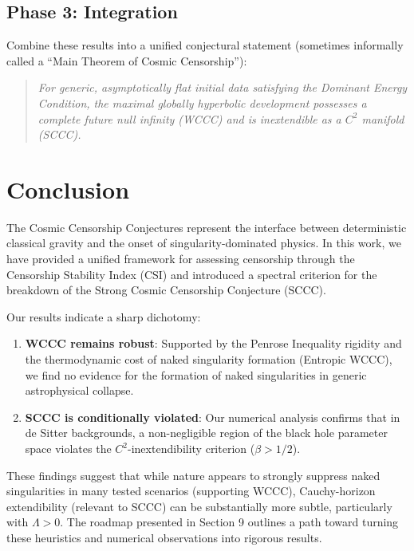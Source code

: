 \documentclass[12pt,a4paper]{article}
\begin{document}
\subsection{Phase 3: Integration}

Combine these results into a unified conjectural statement (sometimes informally called a ``Main Theorem of Cosmic Censorship''):
\begin{quote}
\textit{For generic, asymptotically flat initial data satisfying the Dominant Energy Condition, the maximal globally hyperbolic development possesses a complete future null infinity (WCCC) and is inextendible as a $C^2$ manifold (SCCC).}
\end{quote}


\section{Conclusion}

The Cosmic Censorship Conjectures represent the interface between deterministic classical gravity and the onset of singularity-dominated physics. In this work, we have provided a unified framework for assessing censorship through the Censorship Stability Index (CSI) and introduced a spectral criterion for the breakdown of the Strong Cosmic Censorship Conjecture (SCCC).

Our results indicate a sharp dichotomy:
\begin{enumerate}
    \item \textbf{WCCC remains robust}: Supported by the Penrose Inequality rigidity and the thermodynamic cost of naked singularity formation (Entropic WCCC), we find no evidence for the formation of naked singularities in generic astrophysical collapse.
    \item \textbf{SCCC is conditionally violated}: Our numerical analysis confirms that in de Sitter backgrounds, a non-negligible region of the black hole parameter space violates the $C^2$-inextendibility criterion ($\beta > 1/2$).
\end{enumerate}

These findings suggest that while nature appears to strongly suppress naked singularities in many tested scenarios (supporting WCCC), Cauchy-horizon extendibility (relevant to SCCC) can be substantially more subtle, particularly with $\Lambda>0$. The roadmap presented in Section 9 outlines a path toward turning these heuristics and numerical observations into rigorous results.
\end{document}
